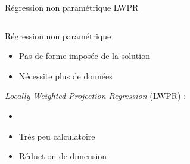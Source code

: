 \begin{frame}{Régression non paramétrique LWPR}
    \begin{columns}
        \begin{column}{0.7\linewidth}
            \begin{block}{Régression non paramétrique}
                \begin{itemize}
                    \item Pas de forme imposée de la solution
                    \item Nécessite plus de données
                \end{itemize}
            \end{block}
            \vspace{1.0em}
            \textit{Locally Weighted Projection Regression} (LWPR) :
            \begin{itemize}
                \item {}
                \item Très peu calculatoire
                \item Réduction de dimension
            \end{itemize}
        \end{column}
    \end{columns}
\end{frame}

